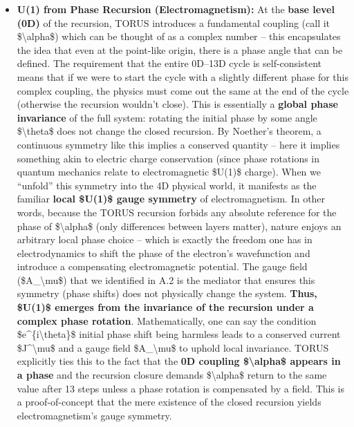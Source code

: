 \documentclass[]{article}
\begin{document}
\begin{itemize}
\item
  \textbf{U(1) from Phase Recursion (Electromagnetism):} At the
  \textbf{base level (0D)} of the recursion, TORUS introduces a
  fundamental coupling (call it \$\textbackslash{}alpha\$) which can be
  thought of as a complex number -- this encapsulates the idea that even
  at the point-like origin, there is a phase angle that can be defined.
  The requirement that the entire 0D--13D cycle is self-consistent means
  that if we were to start the cycle with a slightly different phase for
  this complex coupling, the physics must come out the same at the end
  of the cycle (otherwise the recursion wouldn't close)​. This is
  essentially a \textbf{global phase invariance} of the full system:
  rotating the initial phase by some angle \$\textbackslash{}theta\$
  does not change the closed recursion. By Noether's theorem, a
  continuous symmetry like this implies a conserved quantity -- here it
  implies something akin to electric charge conservation (since phase
  rotations in quantum mechanics relate to electromagnetic \$U(1)\$
  charge). When we ``unfold'' this symmetry into the 4D physical world,
  it manifests as the familiar \textbf{local \$U(1)\$ gauge symmetry} of
  electromagnetism​. In other words, because the TORUS recursion forbids
  any absolute reference for the phase of \$\textbackslash{}alpha\$
  (only differences between layers matter), nature enjoys an arbitrary
  local phase choice -- which is exactly the freedom one has in
  electrodynamics to shift the phase of the electron's wavefunction and
  introduce a compensating electromagnetic potential. The gauge field
  (\$A\_\textbackslash{}mu\$) that we identified in A.2 is the mediator
  that ensures this symmetry (phase shifts) does not physically change
  the system. \textbf{Thus, \$U(1)\$ emerges from the invariance of the
  recursion under a complex phase rotation}. Mathematically, one can say
  the condition \$e\^{}\{i\textbackslash{}theta\}\$ initial phase shift
  being harmless leads to a conserved current
  \$J\^{}\textbackslash{}mu\$ and a gauge field
  \$A\_\textbackslash{}mu\$ to uphold local invariance. TORUS explicitly
  ties this to the fact that the \textbf{0D coupling
  \$\textbackslash{}alpha\$ appears in a phase} and the recursion
  closure demands \$\textbackslash{}alpha\$ return to the same value
  after 13 steps unless a phase rotation is compensated by a field​.
  This is a proof-of-concept that the mere existence of the closed
  recursion yields electromagnetism's gauge symmetry.

\end{itemize}
\end{document}
